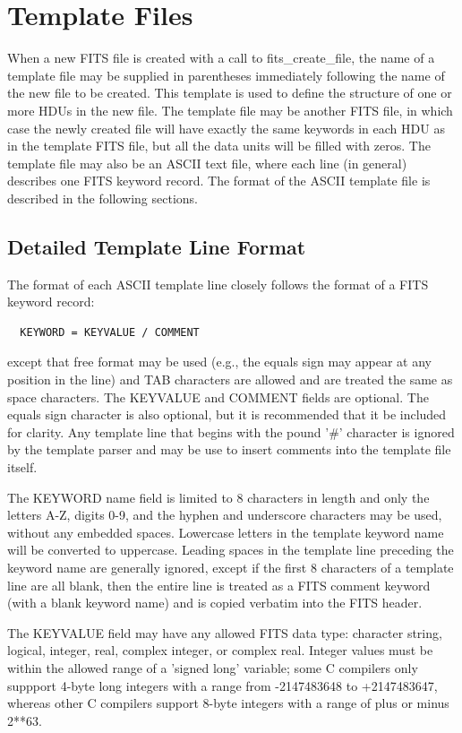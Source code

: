 \documentclass[11pt]{book}
\begin{document}

\chapter{Template Files }

When a new FITS file is created with a call to fits\_create\_file, the
name of a template file may be supplied in parentheses immediately
following the name of the new file to be created.  This template is
used to define the structure of one or more HDUs in the new file.  The
template file may be another FITS file, in which case the newly created
file will have exactly the same keywords in each HDU as in the template
FITS file, but all the data units will be filled with zeros.  The
template file may also be an ASCII text file, where each line (in
general) describes one FITS keyword record.  The format of the ASCII
template file is described in the following sections.


\section{Detailed Template Line Format}

The format of each ASCII template line closely follows the format of a
FITS keyword record:

\begin{verbatim}
  KEYWORD = KEYVALUE / COMMENT
\end{verbatim}
except that free format may be used (e.g., the equals sign may appear
at any position in the line) and TAB characters are allowed and are
treated the same as space characters.  The KEYVALUE and COMMENT fields
are optional.  The equals sign character is also optional, but it is
recommended that it be included for clarity.  Any template line that
begins with the pound '\#' character is ignored by the template parser
and may be use to insert comments into the template file itself.

The KEYWORD name field is limited to 8 characters in length and only
the letters A-Z, digits 0-9, and the hyphen and underscore characters
may be used, without any embedded spaces. Lowercase letters in the
template keyword name will be converted to uppercase.  Leading spaces
in the template line preceding the keyword name are generally ignored,
except if the first 8 characters of a template line are all blank, then
the entire line is treated as a FITS comment keyword (with a blank
keyword name) and is copied verbatim into the FITS header.

The KEYVALUE field may have any allowed  FITS  data type: character
string, logical, integer, real, complex integer, or complex real.  Integer
values must be within the allowed range of a 'signed long' variable;
some C compilers only suppport 4-byte long integers with a range
from -2147483648 to +2147483647, whereas other C compilers support 8-byte
integers with a range of plus or minus 2**63.
\end{document}
